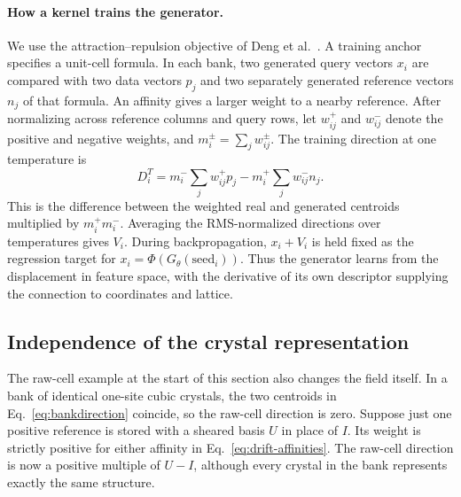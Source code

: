 \paragraph{How a kernel trains the generator.}
We use the attraction--repulsion objective of Deng et al.~\cite{deng}. A training anchor specifies a unit-cell formula. In each bank, two generated query vectors \(x_i\) are compared with two data vectors \(p_j\) and two separately generated reference vectors \(n_j\) of that formula. An affinity gives a larger weight to a nearby reference. After normalizing across reference columns and query rows, let \(w^+_{ij}\) and \(w^-_{ij}\) denote the positive and negative weights, and \(m_i^\pm=\sum_j w^\pm_{ij}\). The training direction at one temperature is
\begin{equation}
 D_i^T=m_i^-\sum_j w^+_{ij}p_j-m_i^+\sum_j w^-_{ij}n_j .
 \label{eq:bankdirection}
\end{equation}
This is the difference between the weighted real and generated centroids multiplied by \(m_i^+m_i^-\). Averaging the RMS-normalized directions over temperatures gives \(V_i\). During backpropagation, \(x_i+V_i\) is held fixed as the regression target for \(x_i=\Phi(G_\theta(\text{seed}_i))\). Thus the generator learns from the displacement in feature space, with the derivative of its own descriptor supplying the connection to coordinates and lattice.

\subsection{Independence of the crystal representation}

The raw-cell example at the start of this section also changes the field itself. In a bank of identical one-site cubic crystals, the two centroids in Eq.~\eqref{eq:bankdirection} coincide, so the raw-cell direction is zero. Suppose just one positive reference is stored with a sheared basis \(U\) in place of \(I\). Its weight is strictly positive for either affinity in Eq.~\eqref{eq:drift-affinities}. The raw-cell direction is now a positive multiple of \(U-I\), although every crystal in the bank represents exactly the same structure.


